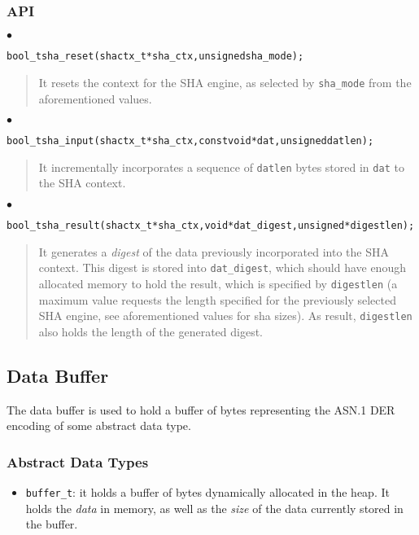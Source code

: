 \documentclass[a4paper]{article}
\newenvironment{api}%
{\noindent$\bullet$\hfill\begin{minipage}[t]{0.97\linewidth}\footnotesize\begin{alltt}}%
{\end{alltt}\end{minipage}}%
\begin{document}
\subsubsection*{API}
\begin{api}
bool_t sha_reset(shactx_t* sha_ctx, unsigned sha_mode);
\end{api}
\begin{quote}\footnotesize
It resets the context for the SHA engine, as selected by
\verb|sha_mode| from the aforementioned values.
\end{quote}
\begin{api}
bool_t sha_input(shactx_t* sha_ctx, const void* dat, unsigned datlen);
\end{api}
\begin{quote}\footnotesize
It incrementally incorporates a sequence of \verb|datlen| bytes stored
in \verb|dat| to the SHA context.
\end{quote}
\begin{api}
bool_t sha_result(shactx_t* sha_ctx, void* dat_digest, unsigned* digestlen);
\end{api}
\begin{quote}\footnotesize
It generates a \emph{digest} of the data previously incorporated into
the SHA context. This digest is stored into \verb|dat_digest|, which
should have enough allocated memory to hold the result, which is
specified by \verb|digestlen| (a maximum value requests the length
specified for the previously selected SHA engine, see aforementioned
values for sha sizes). As result, \verb|digestlen| also holds the
length of the generated digest.
\end{quote}

\subsection{Data Buffer}

The data buffer is used to hold a buffer of bytes representing the
ASN.1 DER encoding of some abstract data type.

\subsubsection*{Abstract Data Types}
\begin{itemize}\small
\item \verb|buffer_t|: it holds a buffer of bytes dynamically
  allocated in the heap. It holds the \emph{data} in memory, as well
  as the \emph{size} of the data currently stored in the buffer.
\end{itemize}
\end{document}
